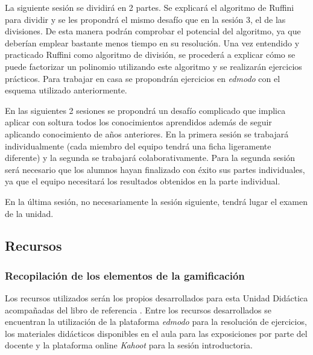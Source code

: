 \label{ResumenSesion6}
%
La siguiente sesión se dividirá en 2 partes. 
%
Se explicará el algoritmo de Ruffini para dividir y se les propondrá el mismo desafío que en la sesión 3, el de las divisiones.
%
De esta manera podrán comprobar el potencial del algoritmo, ya que deberían emplear bastante menos tiempo en su resolución.
%
Una vez entendido y practicado Ruffini como algoritmo de división, se procederá a explicar cómo se puede factorizar un polinomio utilizando este algoritmo y se realizarán ejercicios prácticos.
%
Para trabajar en casa se propondrán ejercicios en \textit{edmodo} con el esquema utilizado anteriormente.
%


\label{ResumenSesion7}
%
\label{ResumenSesion8}
%
En las siguientes 2 sesiones se propondrá un desafío complicado que implica aplicar con soltura todos los conocimientos aprendidos además de seguir aplicando conocimiento de años anteriores.
%
En la primera sesión se trabajará individualmente (cada miembro del equipo tendrá una ficha ligeramente diferente) y la segunda se trabajará colaborativamente.
%
Para la segunda sesión será necesario que los alumnos hayan finalizado con éxito sus partes individuales, ya que el equipo necesitará los resultados obtenidos en la parte individual.

\label{ResumenSesion9}
%
En la última sesión, no necesariamente la sesión siguiente, tendrá lugar el examen de la unidad.



\subsection{Recursos}

\subsubsection{Recopilación de los elementos de la gamificación }

Los recursos utilizados serán los propios desarrollados para esta Unidad Didáctica acompañadas del libro de referencia \cite{MareaVerde}.
%
Entre los recursos desarrollados se encuentran la utilización de la plataforma \textit{edmodo} para la resolución de ejercicios, los materiales didácticos disponibles en el aula para las exposiciones por parte del docente y la plataforma online \textit{Kahoot} para la sesión introductoria.

